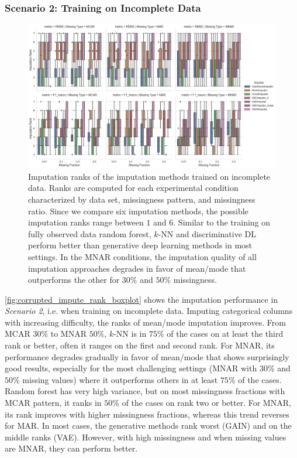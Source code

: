 \documentclass[utf8]{frontiersSCNS} %
\begin{document}
\subsubsection{Scenario 2: Training on Incomplete Data}


\begin{figure}\centering
	\includegraphics[width=1\columnwidth]{corrupted_impute_rank_boxplot}
	\caption{Imputation ranks of the  imputation methods trained on incomplete data. Ranks are computed for each experimental condition characterized by data set, missingness pattern, and missingness ratio. Since we compare six imputation methods, the possible imputation ranks range between $1$ and $6$. Similar to the training on fully observed data random forest, $k$-NN and discriminative DL perform better than generative deep learning methods in most settings. In the MNAR conditions, the imputation quality of all imputation approaches degrades in favor of mean/mode that outperforms the other for $30\%$ and $50\%$ missingness.}
	\label{fig:corrupted_impute_rank_boxplot}
\end{figure}

\autoref{fig:corrupted_impute_rank_boxplot} shows the imputation performance in \textit{Scenario 2}, i.e. when training on incomplete data. Imputing categorical columns with increasing difficulty, the ranks of mean/mode imputation improves. From MCAR $30\%$ to MNAR $50\%$, $k$-NN is in $75\%$ of the cases on at least the third rank or better, often it ranges on the first and second rank. For MNAR, its performance degrades gradually in favor of mean/mode that shows surprisingly good results, especially for the most challenging settings (MNAR with $30\%$ and $50\%$ missing values) where it outperforms others in at least $75\%$ of the cases. Random forest has very high variance, but on most missingness fractions with MCAR pattern, it ranks in $50\%$ of the cases on rank two or better. For MNAR, its rank improves with higher missingness fractions, whereas this trend reverses for MAR. In most cases, the generative methods rank worst (GAIN) and on the middle ranks (VAE). However, with high missingness and when missing values are MNAR, they can perform better.
\end{document}
